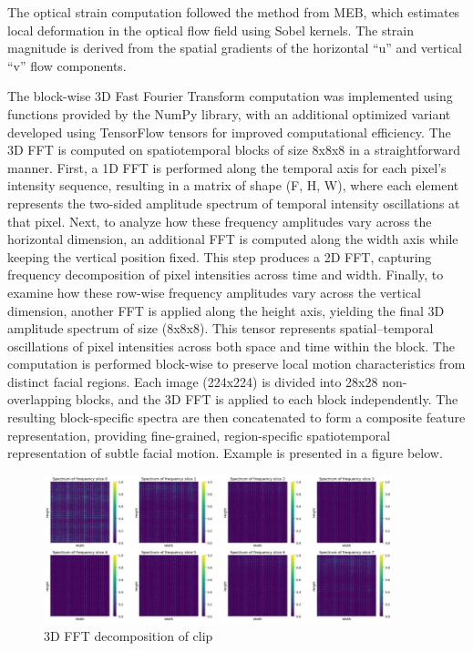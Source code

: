 \documentclass{article}
\begin{document}
The optical strain computation followed the method from MEB, which estimates local deformation in the optical flow field using Sobel kernels. The strain magnitude is derived from the spatial gradients of the horizontal “u” and vertical “v” flow components.

The block-wise 3D Fast Fourier Transform computation was implemented using functions provided by the NumPy library, with an additional optimized variant developed using TensorFlow tensors for improved computational efficiency. The 3D FFT is computed on spatiotemporal blocks of size 8x8x8 in a straightforward manner. First, a 1D FFT is performed along the temporal axis for each pixel’s intensity sequence, resulting in a matrix of shape (F, H, W), where each element represents the two-sided amplitude spectrum of temporal intensity oscillations at that pixel. Next, to analyze how these frequency amplitudes vary across the horizontal dimension, an additional FFT is computed along the width axis while keeping the vertical position fixed. This step produces a 2D FFT, capturing frequency decomposition of pixel intensities across time and width. Finally, to examine how these row-wise frequency amplitudes vary across the vertical dimension, another FFT is applied along the height axis, yielding the final 3D amplitude spectrum of size (8x8x8). This tensor represents spatial–temporal oscillations of pixel intensities across both space and time within the block. The computation is performed block-wise to preserve local motion characteristics from distinct facial regions. Each image (224x224) is divided into 28x28 non-overlapping blocks, and the 3D FFT is applied to each block independently. The resulting block-specific spectra are then concatenated to form a composite feature representation, providing fine-grained, region-specific spatiotemporal representation of subtle facial motion. Example is presented in a figure below.

\begin{figure}[H]
  \begin{center}
    \includegraphics*[width=0.9\textwidth]{Figures/Picture1.png}
  \end{center}
  \caption{3D FFT decomposition of clip}
  \label{fig:fft}
\end{figure}
\end{document}

